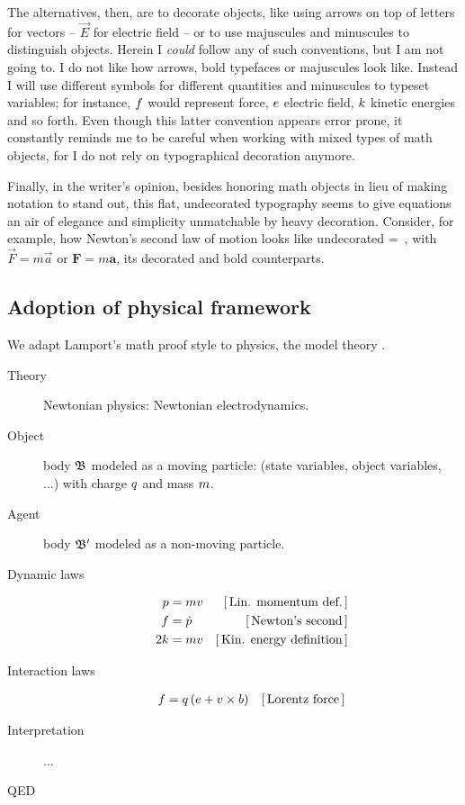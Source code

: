The alternatives, then, are to decorate objects, like using arrows on top of letters for vectors -- $\vec E$ for electric field -- or to use majuscules and minuscules to distinguish objects. Herein I \emph{could} follow any of such conventions, but I am not going to. I do not like how arrows, bold typefaces or majuscules look like. Instead I will use different symbols for different quantities and minuscules to typeset variables; for instance, $f$ would represent force, $e$ electric field, $k$ kinetic energies and so forth. Even though this latter convention appears error prone, it constantly reminds me to be careful when working with mixed types of math objects, for I do not rely on typographical decoration anymore.

Finally,
%
%
in the writer's opinion, besides honoring math objects in lieu of making notation to stand out, this flat, undecorated typography seems to give equations an air of elegance and simplicity unmatchable by heavy decoration. Consider, for example, how Newton's second law of motion looks like undecorated
%
%
\beq
  \force = \mass\acc\,,
\eeq
%
with $\vec F = m\vec a$ or $\mathbf{F} = m\mathbf{a}$, its decorated and bold counterparts.


\subsection{Adoption of physical framework}
%
We adapt Lamport's math proof style \cite{lamport:1993,lamport:2012} to physics, \via the model theory \cite{hestenes:1987}.
%
%
\begin{description}
%
\item[Theory] Newtonian physics: Newtonian electrodynamics.
%
\item[Object] body $\mathfrak{B}$ modeled as a moving particle: (state variables, object variables, ...) with charge $q$ and mass $m$.
%
\item[Agent] body $\mathfrak{B}'$ modeled as a non-moving particle.
%
\item[Dynamic laws]
%
\begin{align}
  p &= mv & [\,\text{Lin. momentum def.}\,] \\
  f &= \dot{p} & [\,\text{Newton's second}\,] \\
  2k &= mv & [\,\text{Kin. energy definition}\,]
\end{align}
%
\item[Interaction laws]
%
\begin{align}
  f &= q\left({e + v\times b}\right) & [\,\text{Lorentz force}\,]
\end{align}
%
\item[Interpretation] ...
%
\item[QED]
%
\end{description}

